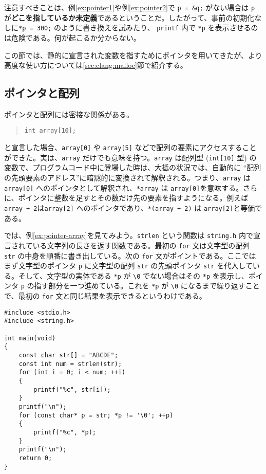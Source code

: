 注意すべきことは、例\ref{ex:pointer1}や例\ref{ex:pointer2}で \texttt{p = \&q;} がない場合は \texttt{p} が\textbf{どこを指しているか未定義}であるということだ。したがって、事前の初期化なしに\texttt{*p = 300;} のように書き換えを試みたり、 \texttt{printf} 内で \texttt{*p} を表示させるのは危険である。何が起こるか分からない。

この節では、静的に宣言された変数を指すためにポインタを用いてきたが、より高度な使い方については\ref{sec:clang:malloc}節で紹介する。

\subsection{ポインタと配列}
\label{sec:C:pointer-array}
ポインタと配列には密接な関係がある。
\begin{quote}
    \begin{verbatim}
int array[10];
\end{verbatim}
\end{quote}
と宣言した場合、\texttt{array[0]} や \texttt{array[5]} などで配列の要素にアクセスすることができた。実は、\texttt{array} だけでも意味を持つ。\texttt{array} は配列型 (\texttt{int[10]} 型) の変数で、プログラムコード中に登場した時は、大抵の状況では、自動的に ``配列の先頭要素のアドレス''に暗黙的に変換されて解釈される。つまり、\texttt{array} は \texttt{array[0]} へのポインタとして解釈され、\texttt{*array} は \texttt{array[0]}を意味する。さらに、ポインタに整数を足すとその数だけ先の要素を指すようになる。例えば\texttt{array + 2}は\texttt{array[2]} へのポインタであり、\texttt{*(array + 2)} は \texttt{array[2]}と等価である。

では、例\ref{ex:pointer-array}を見てみよう。\texttt{strlen} という関数は \texttt{string.h} 内で宣言されている文字列の長さを返す関数である。最初の \texttt{for} 文は文字型の配列 \texttt{str} の中身を順番に書き出している。次の \texttt{for} 文がポイントである。ここではまず文字型のポインタ \texttt{p} に文字型の配列 \texttt{str} の先頭ポインタ \texttt{str} を代入している。そして、文字型の実体である \texttt{*p} が \texttt{\textbackslash 0} でない場合はその \texttt{*p} を表示し、ポインタ \texttt{p} の指す部分を一つ進めている。これを \texttt{*p} が \texttt{\textbackslash 0} になるまで繰り返すことで、最初の \texttt{for} 文と同じ結果を表示できるというわけである。
\begin{reidai}\label{ex:pointer-array}
    \begin{verbatim}
#include <stdio.h>
#include <string.h>

int main(void)
{
    const char str[] = "ABCDE";
    const int num = strlen(str);
    for (int i = 0; i < num; ++i)
    {
        printf("%c", str[i]);
    }
    printf("\n");
    for (const char* p = str; *p != '\0'; ++p)
    {
        printf("%c", *p);
    }
    printf("\n");
    return 0;
}

\end{verbatim}
\end{reidai}

